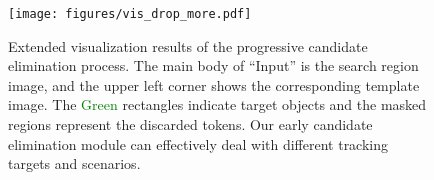 \begin{figure}[t]
\centering
\setlength{\abovecaptionskip}{0.05cm}
\texttt{[image: figures/vis\_drop\_more.pdf]}
\caption{Extended visualization results of the progressive candidate elimination process. The main body of ``Input'' is the search region image, and the upper left corner shows the corresponding template image. The \textcolor{green}{Green} rectangles indicate target objects and the masked regions represent the discarded tokens. Our early candidate elimination module can effectively deal with different tracking targets and scenarios.}
\label{fig:vis_drop_more}
\end{figure}
